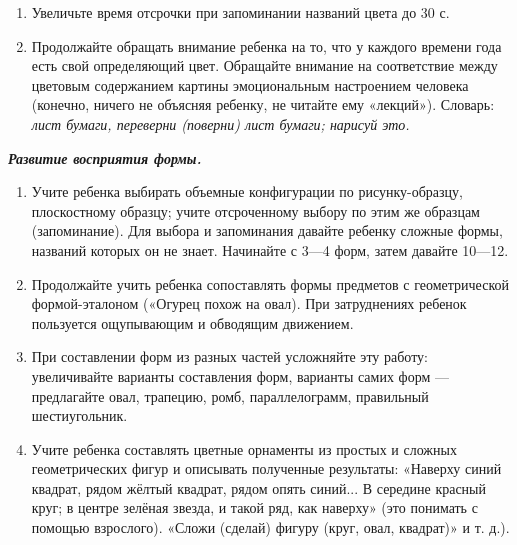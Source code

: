 \documentclass{book}
\renewcommand{\emph}[1]{\textit{#1}}
\begin{document}
\begin{enumerate}
\def\labelenumi{\arabic{enumi}.}
\setcounter{enumi}{2}
\item
  
  Увеличьте время отсрочки при запоминании названий цвета до 30 с.
  
\item
  
  Продолжайте обращать внимание ребенка на то, что у каждого времени
  года есть свой определяющий цвет. Обращайте внимание на соответствие
  между цветовым содержанием картины эмоциональным настроением человека
  (конечно, ничего не объясняя ребенку, не читайте ему «лекций»).
  Словарь: \emph{лист бумаги, переверни (поверни) лист бумаги; нарисуй
  это.}
  
\end{enumerate}


\emph{\textbf{Развитие восприятия формы.}}


\begin{enumerate}
\def\labelenumi{\arabic{enumi}.}
\item
  
  Учите ребенка выбирать объемные конфигурации по рисунку-образцу,
  плоскостному образцу; учите отсроченному выбору по этим же образцам
  (запоминание). Для выбора и запоминания давайте ребенку сложные формы,
  названий которых он не знает. Начинайте с 3---4 форм, затем давайте
  10---12.
  
\item
  
  Продолжайте учить ребенка сопоставлять формы предметов с
  геометрической формой-эталоном («Огурец похож на овал). При
  затруднениях ребенок пользуется ощупывающим и обводящим движением.
  
\item
  
  При составлении форм из разных частей усложняйте эту работу:
  увеличивайте варианты составления форм, варианты самих форм ---
  предлагайте овал, трапецию, ромб, параллелограмм, правильный
  шестиугольник.
  
\item
  
  Учите ребенка составлять цветные орнаменты из простых и сложных
  геометрических фигур и описывать полученные результаты: «Наверху синий
  квадрат, рядом жёлтый квадрат, рядом опять синий... В середине красный
  круг; в центре зелёная звезда, и такой ряд, как наверху» (это понимать
  с помощью взрослого). «Сложи (сделай) фигуру (круг, овал, квадрат)» и
  т. д.).
  
\end{enumerate}
\end{document}
